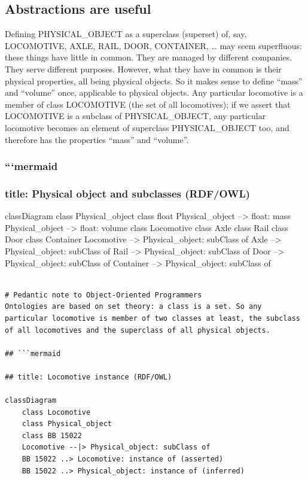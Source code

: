 \documentclass[
  11pt,
]{article}
\begin{document}
\hypertarget{abstractions-are-useful}{%
\subsection{Abstractions are useful}\label{abstractions-are-useful}}

Defining PHYSICAL\_OBJECT as a superclass (superset) of, say,
LOCOMOTIVE, AXLE, RAIL, DOOR, CONTAINER, \ldots{} may seem superfluous:
these things have little in common. They are managed by different
companies. They serve different purposes. However, what they have in
common is their physical properties, all being physical objects. So it
makes sense to define ``mass'' and ``volume'' once, applicable to
physical objects. Any particular locomotive is a member of class
LOCOMOTIVE (the set of all locomotives); if we assert that LOCOMOTIVE is
a subclass of PHYSICAL\_OBJECT, any particular locomotive becomes an
element of superclass PHYSICAL\_OBJECT too, and therefore has the
properties ``mass'' and ``volume''.

\hypertarget{mermaid-1}{%
\subsubsection{```mermaid}\label{mermaid-1}}

\hypertarget{title-physical-object-and-subclasses-rdfowl}{%
\subsubsection{title: Physical object and subclasses
(RDF/OWL)}\label{title-physical-object-and-subclasses-rdfowl}}

classDiagram class Physical\_object class float Physical\_object
--\textgreater{} float: mass Physical\_object --\textgreater{} float:
volume class Locomotive class Axle class Rail class Door class Container
Locomotive --\textbar\textgreater{} Physical\_object: subClass of Axle
--\textbar\textgreater{} Physical\_object: subClass of Rail
--\textbar\textgreater{} Physical\_object: subClass of Door
--\textbar\textgreater{} Physical\_object: subClass of Container
--\textbar\textgreater{} Physical\_object: subClass of

\begin{verbatim}

# Pedantic note to Object-Oriented Programmers
Ontologies are based on set theory: a class is a set. So any particular locomotive is member of two classes at least, the subclass of all locomotives and the superclass of all physical objects.

## ```mermaid

## title: Locomotive instance (RDF/OWL)

classDiagram
    class Locomotive
    class Physical_object
    class BB 15022
    Locomotive --|> Physical_object: subClass of
    BB 15022 ..> Locomotive: instance of (asserted)
    BB 15022 ..> Physical_object: instance of (inferred)
\end{verbatim}
\end{document}
